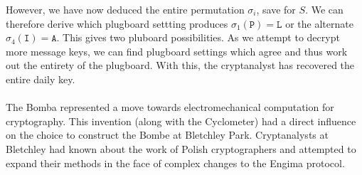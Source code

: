 \noindent However, we have now deduced the entire permutation $\sigma_i$, save for $S$. We can therefore derive which plugboard settting produces $\sigma_1(\texttt{P}) = \texttt{L}$ or the alternate $\sigma_4(\texttt{I}) = \texttt{A}$. This gives two pluboard possibilities. As we attempt to decrypt more message keys, we can find plugboard settings which agree and thus work out the entirety of the plugboard. With this, the cryptanalyst has recovered the entire daily key.
\\\\The Bomba represented a move towards electromechanical computation for cryptography. This invention (along with the Cyclometer) had a direct influence on the choice to construct the Bombe at Bletchley Park. Cryptanalysts at Bletchley had known about the work of Polish cryptographers and attempted to expand their methods in the face of complex changes to the Engima protocol.

